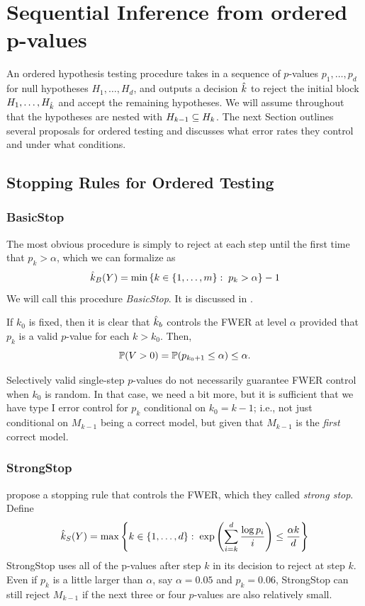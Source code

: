 \documentclass{article}
\begin{document}
\section{Sequential Inference from ordered p-values}
\label{sec:sequential}

An ordered hypothesis testing procedure takes in a sequence of $p$-values $p_1, \ldots, p_d$ for null hypotheses $H_{1}, \ldots, H_{d}$, and outputs a decision $\hk$ to reject the initial block $H_{1}, \ldots, H_{\hk}$ and accept the remaining hypotheses. We will assume throughout that the hypotheses are nested with $H_{k-1} \sub H_k$. The next Section outlines several proposals for ordered testing and discusses what error rates they control and under what conditions. 

\subsection{Stopping Rules for Ordered Testing}
\label{sec:orderedProposals}


\subsubsection{BasicStop}
The most obvious procedure is simply to reject at each step until the first time that $p_k > \alpha$, which we can formalize as
\[
\hk_B(Y) = \min\left\{k \in \{1,\ldots,m\} :\;
  p_k > \alpha\right\} - 1
\]
We will call this procedure {\em BasicStop}. 
It is discussed in \citet{marcus1976}.

If $k_0$ is fixed, then it is clear that $\hk_b$ controls the FWER at level $\alpha$ provided that $p_{k}$ is a valid $p$-value for each $k>k_0$. Then, 
\[
\P(V>0) = \P(p_{k_0+1} \leq \alpha) \leq \alpha.
\]

Selectively valid single-step $p$-values do not necessarily guarantee FWER control when $k_0$ is random. In that case, we need a bit more, but it is sufficient that we have type I error control for $p_k$ conditional on $k_0=k-1$; i.e., not just conditional on $M_{k-1}$ being a correct model, but given that $M_{k-1}$ is the {\em first} correct model.


\subsubsection{StrongStop}

\citet{gsell2013sequential} propose a stopping rule that controls the FWER, which they called {\em strong stop}. Define
\[
  \hk_{S}(Y) = \max\left\{k \in \{1,\ldots,d\} :\;
    \exp\left(\sum_{i=k}^d \frac{\log p_i}{i}\right) 
    \leq \frac{\alpha k}{d}\right\}
\]
StrongStop uses all of the p-values after step $k$ in its decision to reject at step $k$. 
Even if $p_k$ is a little larger than $\alpha$, say $\alpha=0.05$ and $p_k=0.06$, StrongStop can still reject $M_{k-1}$ if the next three or four $p$-values are also relatively small.
\end{document}
